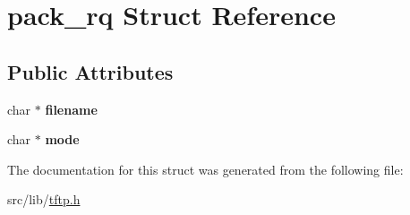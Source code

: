 \hypertarget{structpack__rq}{}\section{pack\+\_\+rq Struct Reference}
\label{structpack__rq}
\subsection*{Public Attributes}
\begin{DoxyCompactItemize}
\item 
char $\ast$ {\bfseries filename}\hypertarget{structpack__rq_a622b8df02698132010c1be70b3c4800c}{}\label{structpack__rq_a622b8df02698132010c1be70b3c4800c}

\item 
char $\ast$ {\bfseries mode}\hypertarget{structpack__rq_a9db298cebff7089a3a4d51957d4e09ac}{}\label{structpack__rq_a9db298cebff7089a3a4d51957d4e09ac}

\end{DoxyCompactItemize}


The documentation for this struct was generated from the following file\+:\begin{DoxyCompactItemize}
\item 
src/lib/\hyperlink{tftp_8h}{tftp.\+h}\end{DoxyCompactItemize}
